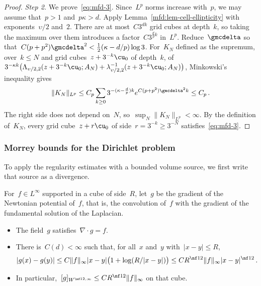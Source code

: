 \documentclass[11pt]{amsart}
\begin{document}
\begin{proof}
\smallskip

\emph{Step 2.} We prove~\eqref{eq:mfd-3}. Since~$L^p$ norms increase with~$p$, we may assume that~$p>1$ and~$p\kappa>d$. Apply Lemma~\ref{mfd:lem-cell-ellipticity} with exponents~$\upsilon/2$ and~$2$. There are at most~$C3^{dk}$ grid cubes at depth~$k$, so taking the maximum over them introduces a factor~$C3^{\frac{d}{p}k}$ in~$L^p$. Reduce~$\gmcdelta$ so that~$C(p+p^2)\gmcdelta^2<\frac12(\kappa-d/p)\log3$. For~$K_N$ defined as the supremum, over~$k\leq N$ and grid cubes~$z+3^{-k}\cu_0$ of depth~$k$, of~$3^{-\kappa k}\bigl(\Lambda_{\upsilon/2,2}(z+3^{-k}\cu_0;A_N)+\lambda^{-1}_{\upsilon/2,2}(z+3^{-k}\cu_0;A_N)\bigr)$, Minkowski's inequality gives
\begin{equation*}
	\|K_N\|_{L^p}
	\leq C_p\sum_{k\geq0}3^{-(\kappa-\frac{d}{p})k}
	e^{C(p+p^2)\gmcdelta^2k}\leq C_p\,.
\end{equation*}
The right side does not depend on~$N$, so~$\sup_N\|K_N\|_{L^p}<\infty$. By the definition of~$K_N$, every grid cube~$z+r\cu_0$ of side~$r=3^{-k}\geq3^{-N}$ satisfies~\eqref{eq:mfd-3}.
\end{proof}

\subsubsection{Morrey bounds for the Dirichlet problem}

To apply the regularity estimates with a bounded volume source, we first write that source as a divergence.

For~$f\in L^\infty$ supported in a cube of side~$R$, let~$g$ be the gradient of the Newtonian potential of~$f$, that is, the convolution of~$f$ with the gradient of the fundamental solution of the Laplacian.

\begin{lemma}
\label{mfd:lem-primitive}
\begin{itemize}
\item The field~$g$ satisfies~$\nabla\cdot g=f$.
\item There is~$C(d)<\infty$ such that, for all~$x$ and~$y$ with~$|x-y|\leq R$,
\begin{equation}
	|g(x)-g(y)|\leq C\|f\|_\infty|x-y|\bigl(1+\log(R/|x-y|)\bigr)\leq CR^{\nf12}\|f\|_\infty|x-y|^{\nf12}\,.
	\label{eq:mfd-primitive}
\end{equation}
\item In particular,~$[g]_{W^{\nf12,\infty}}\leq CR^{\nf12}\|f\|_\infty$ on that cube.
\end{itemize}
\end{lemma}
\end{document}
